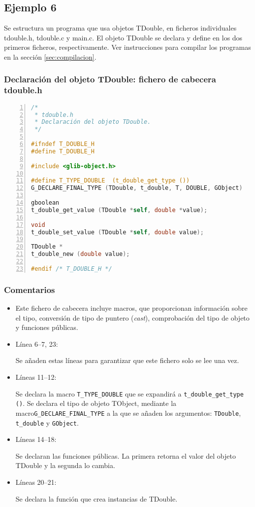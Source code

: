\subsection{Ejemplo 6}
Se estructura un programa que usa objetos \textsf{TDouble}, en ficheros individuales \textsf{tdouble.h},
\textsf{tdouble.c} y \textsf{main.c}.
El objeto \textsf{TDouble} se declara y define en los dos primeros ficheros, respectivamente.
Ver instrucciones para compilar los programas en la sección \ref{sec:compilacion}.

\subsubsection{Declaración del objeto \textsf{TDouble}: fichero de cabecera \textsf{tdouble.h}}

\begin{lstlisting}[language=C, numbers=left]
/*
 * tdouble.h
 * Declaración del objeto TDouble.
 */

#ifndef T_DOUBLE_H
#define T_DOUBLE_H
 
#include <glib-object.h>
 
#define T_TYPE_DOUBLE  (t_double_get_type ())
G_DECLARE_FINAL_TYPE (TDouble, t_double, T, DOUBLE, GObject)
 
gboolean
t_double_get_value (TDouble *self, double *value);
 
void
t_double_set_value (TDouble *self, double value);
 
TDouble *
t_double_new (double value);

#endif /* T_DOUBLE_H */
\end{lstlisting}

\subsubsection{Comentarios}
\begin{itemize}
\item Este fichero de cabecera incluye macros, que proporcionan información sobre el tipo, conversión de
  tipo de puntero (\textit{cast}), comprobación del tipo de objeto y funciones públicas.
\item Línea 6--7, 23:\par
  Se añaden estas líneas para garantizar que este fichero solo se lee una vez.
\item Líneas 11--12:\par
  Se declara la macro \texttt{T\_TYPE\_DOUBLE} que se expandirá a \texttt{t\_double\_get\_type ()}.
  Se declara el tipo de objeto \textsf{TObject}, mediante la macro\texttt{G\_DECLARE\_FINAL\_TYPE}
  a la que se añaden los argumentos: \texttt{TDouble}, \texttt{t\_double} y \texttt{GObject}.
\item Líneas 14--18:\par
  Se declaran las funciones públicas. La primera retorna el valor del objeto \textsf{TDouble} y la
  segunda lo cambia.
\item Líneas 20--21:\par
  Se declara la función que crea instancias de \textsf{TDouble}.
\end{itemize}

